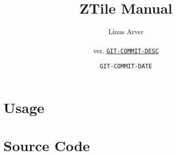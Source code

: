 \documentclass[letterpaper,twoside,12pt]{report}
\begin{document}
\title{ZTile Manual}
\author{Linus Arver\\
\\
ver. \href{http://www.github.com/listx/ztile/commit/GIT-COMMIT-HASH}{\texttt{GIT-COMMIT-DESC}}
}
\date{\texttt{GIT-COMMIT-DATE}}
\maketitle{}
\tableofcontents{}
\part{Usage}

\part{Source Code}




\end{document}
